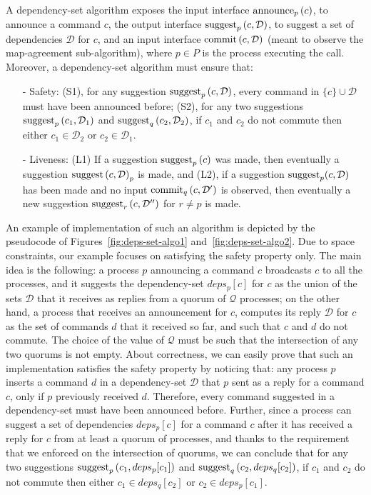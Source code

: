 A dependency-set algorithm exposes the input interface $\operatorname{announce}_p\left( c \right)$, to announce a command $c$, the output interface $\operatorname{suggest}_p \left( c,\mathcal{D}\right)$, to suggest a set of dependencies $\mathcal{D}$ for $c$, and an input interface $\operatorname{commit}\left( c,\mathcal{D} \right)$ (meant to observe the map-agreement sub-algorithm), where $p\in P$ is the process executing the call.
Moreover, a dependency-set algorithm must ensure that:
\begin{itemize}[noitemsep,nolistsep]
    \item[-] Safety: (S1), for any suggestion $\operatorname{suggest}_p \left( c,\mathcal{D}\right)$, every command in $\{c\}\cup \mathcal{D}$ must have been announced before; (S2), for any two suggestions $\operatorname{suggest}_p \left( c_1,\mathcal{D}_1\right)$ and $\operatorname{suggest}_q \left( c_2,\mathcal{D}_2\right)$, if $c_1$ and $c_2$ do not commute then either $c_1\in \mathcal{D}_2$ or $c_2 \in \mathcal{D}_1$.
    \item[-] Liveness: (L1) If a suggestion $\operatorname{suggest}_p\left( c \right)$ was made, then eventually a suggestion $\operatorname{suggest}\left( c,\mathcal{D} \right)_p$ is made, and (L2), if a suggestion $\operatorname{suggest}_p(c,\mathcal{D})$ has been made and no input $\operatorname{commit}_q\left( c,\mathcal{D'} \right)$ is observed, then eventually a new suggestion $\operatorname{suggest}_r\left( c,\mathcal{D''} \right)$ for $r\neq p$ is made.
\end{itemize}

An example of implementation of such an algorithm is depicted by the pseudocode of Figures~\ref{fig:deps-set-algo1} and~\ref{fig:deps-set-algo2}. Due to space constraints, our example focuses on satisfying the safety property only. The main idea is the following: a process $p$ announcing a command $c$ broadcasts $c$ to all the processes, and it suggests the dependency-set $deps_p[c]$ for $c$ as the union of the sets $\mathcal{D}$ that it receives as replies from a quorum of $\mathcal{Q}$ processes; on the other hand, a process that receives an announcement for $c$, computes its reply $\mathcal{D}$ for $c$ as the set of commands $d$ that it received so far, and such that $c$ and $d$ do not commute. The choice of the value of $\mathcal{Q}$ must be such that the intersection of any two quorums is not empty. About correctness, we can easily prove that such an implementation satisfies the safety property by noticing that:  any process $p$ inserts a command $d$ in a dependency-set $\mathcal{D}$ that $p$ sent as a reply for a command $c$, only if $p$ previously received $d$. Therefore, every command suggested in a dependency-set must have been announced before. Further, since a process can suggest a set of dependencies $deps_p[c]$ for a command $c$ after it has received a reply for $c$ from at least a quorum of processes, and thanks to the requirement that we enforced on the intersection of quorums, we can conclude that for any two suggestions $\operatorname{suggest}_p \left( c_1,deps_p[c_1]\right)$ and $\operatorname{suggest}_q \left( c_2,deps_q[c_2]\right)$,  if $c_1$ and $c_2$ do not commute then either $c_1\in deps_q[c_2]$ or $c_2 \in deps_p[c_1]$.


